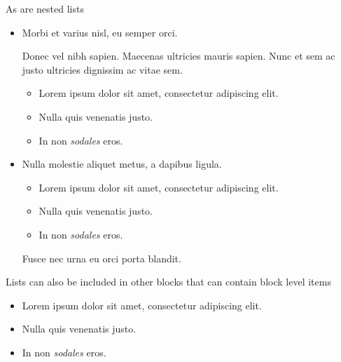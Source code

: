 As are nested lists



\begin{itemize}
\item Morbi et varius nisl, eu semper orci.

Donec vel nibh sapien. Maecenas ultricies mauris sapien. Nunc et sem ac justo ultricies dignissim ac vitae sem.

\begin{itemize}
\item Lorem ipsum dolor sit amet, consectetur adipiscing elit.


\item Nulla quis venenatis justo.


\item In non \emph{sodales} eros.

\end{itemize}

\item Nulla molestie aliquet metus, a dapibus ligula.

\begin{itemize}
\item[1. ] Lorem ipsum dolor sit amet, consectetur adipiscing elit.


\item[2. ] Nulla quis venenatis justo.


\item[3. ] In non \emph{sodales} eros.

\end{itemize}
Fusce nec urna eu orci porta blandit.

\end{itemize}


Lists can also be included in other blocks that can contain block level items



\begin{tcolorbox}[toptitle=-1mm,bottomtitle=1mm,colback=admonition-note!50!white,colframe=admonition-note,title=\textbf{Bulleted lists in admonitions}]
\begin{itemize}
\item Lorem ipsum dolor sit amet, consectetur adipiscing elit.


\item Nulla quis venenatis justo.


\item In non \emph{sodales} eros.

\end{itemize}
\end{tcolorbox}



